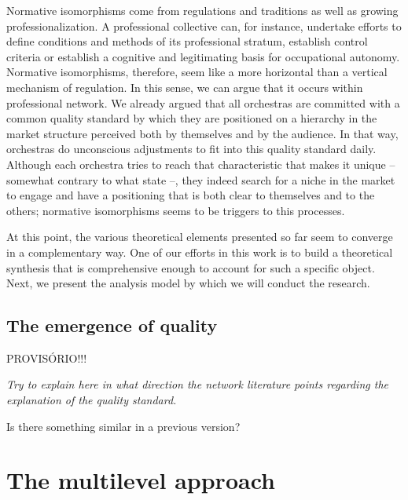 \documentclass[a4paper, 12pt, openright, oneside, german, french, brazil, english]{abntex2}
\begin{document}
	Normative isomorphisms come from regulations and traditions as well as growing professionalization. A professional collective can, for instance, undertake efforts to define conditions and methods of its professional stratum, establish control criteria or establish a cognitive and legitimating basis for occupational autonomy. Normative isomorphisms, therefore, seem like a more horizontal than a vertical mechanism of regulation. In this sense, we can argue that it occurs within professional network. We already argued that all orchestras are committed with a common quality standard by which they are positioned on a hierarchy in the market structure perceived both by themselves and by the audience. In that way, orchestras do unconscious adjustments to fit into this quality standard daily. Although each orchestra tries to reach that characteristic that makes it unique -- somewhat contrary to what  state --, they indeed search for a niche in the market to engage and have a positioning that is both clear to themselves and to the others; normative isomorphisms seems to be triggers to this processes.
	
	
	
	At this point, the various theoretical elements presented so far seem to converge in a complementary way. One of our efforts in this work is to build a theoretical synthesis that is comprehensive enough to account for such a specific object. Next, we present the analysis model by which we will conduct the research.


        \section{The emergence of quality}

        PROVISÓRIO!!!

        \textit{Try to explain here in what direction the network literature points regarding the explanation of the quality standard.}

        Is there something similar in a previous version?

        \chapter{The multilevel approach}
	
\end{document}
